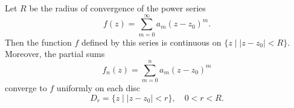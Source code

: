 Let $R$ be the radius of convergence of the power series
$$
f(z) = \sum_{m=0}^{\infty} a_m(z - z_0)^m.
$$
Then the function $f$ defined by this series is continuous on $\{z \mid |z - z_0| < R\}$. Moreover, the partial sums
$$
f_n(z) = \sum_{m=0}^{n} a_m(z - z_0)^m
$$
converge to $f$ uniformly on each disc
$$
D_r = \{z \mid |z - z_0| < r\}, \quad 0 < r < R.
$$
